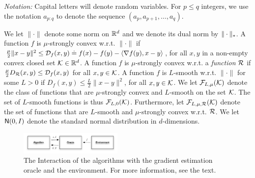 
\textit{Notation:} Capital letters will denote random variables.
For $p\le q$ integers, 
 we use the notation $a_{p:q}$ to denote
 the sequence $(a_p,a_{p+1}, \dots, a_{q})$.

 We let $\| \cdot \|$ denote some norm on $\mathbb{R}^d$ and we denote its dual norm by $\|\cdot\|_*$.
 A function $f$ is $\mu$-strongly convex w.r.t. $\| \cdot \|$  if 
 $\tfrac{\mu}{2} \|x-y\|^2 \le \mathcal{D}_f(x,y)\doteq f(x)-f(y)-\langle \nabla f(y),x-y \rangle$, for all $x,y$ in a non-empty convex closed set $\mathcal{K} \in \mathbb{R}^d$. 
A function $f$ is $\mu$-strongly convex w.r.t. a \emph{function} $\mathcal{R}$ 
	if $\tfrac{\mu}{2}D_{\mathcal{R}}(x,y)\le\mathcal{D}_f(x,y)$ for all $x,y \in \mathcal{K}$.
 A function $f$ is $L$-smooth w.r.t. $\| \cdot \|$ for some $L>0$ if 
$ D_f(x,y) \le \tfrac{L}{2} \|x-y\|^2$, for all $x,y \in \mathcal{K}$.
 We let $\mathcal{F}_{L,\mu}(\mathcal{K})$ denote the class of functions that are $\mu$-strongly convex and $L$-smooth on the set $\mathcal{K}$. 
 The set of $L$-smooth functions is thus $\mathcal{F}_{L,0}(\mathcal{K})$. Furthermore, let $\mathcal{F}_{L,\mu,\mathcal{R}}(\mathcal{K})$ denote the set of functions that are  $L$-smooth and $\mu$-strongly convex w.r.t. $\mathcal{R}$.
 We let $\mathsf{N}(0, I)$ denote the standard normal distribution in $d$-dimensions.

\begin{figure}
\begin{center}
\includegraphics[width=0.45\textwidth]{../figs/oracle}
\end{center}
\caption{The Interaction of the algorithms with the gradient estimation oracle and the environment. For more information, see the text.}
\label{fig:oracle}
\end{figure}

